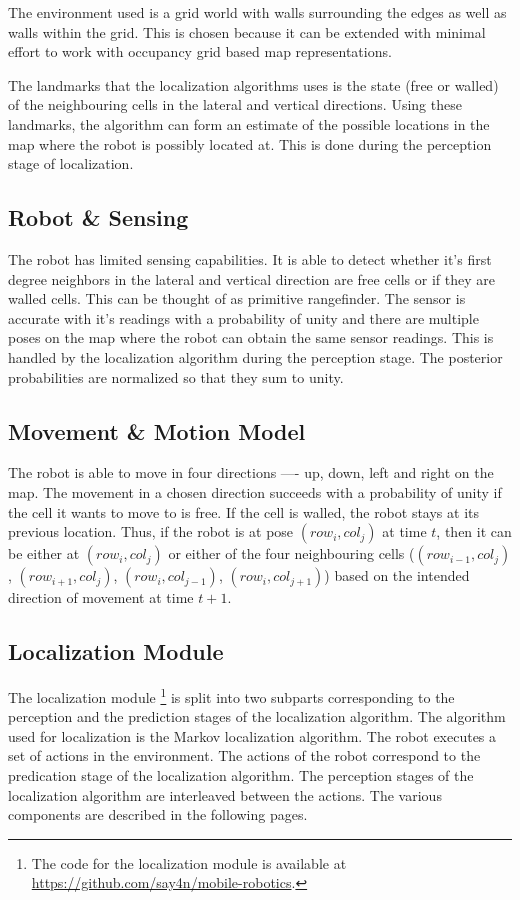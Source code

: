 \documentclass[a4paper,10pt]{article} %
\begin{document}
The environment used is a grid world with walls surrounding the edges as well as walls within the grid.
This is chosen because it can be extended with minimal effort to work with occupancy grid based map representations.

The landmarks that the localization algorithms uses is the state (free or walled) of the neighbouring cells in the lateral and vertical directions.
Using these landmarks, the algorithm can form an estimate of the possible locations in the map where the robot is possibly located at.
This is done during the perception stage of localization.

\subsection{Robot \& Sensing}

The robot has limited sensing capabilities.
It is able to detect whether it's first degree neighbors in the lateral and vertical direction are free cells or if they are walled cells.
This can be thought of as primitive rangefinder.
The sensor is accurate with it's readings with a probability of unity and there are multiple poses on the map where the robot can obtain the same sensor readings.
This is handled by the localization algorithm during the perception stage.
The posterior probabilities are normalized so that they sum to unity.

\subsection{Movement \& Motion Model}

The robot is able to move in four directions —- up, down, left and right on the map.
The movement in a chosen direction succeeds with a probability of unity if the cell it wants to move to is free.
If the cell is walled, the robot stays at its previous location.
Thus, if the robot is at pose $(row_i, col_j)$ at time $t$, then it can be either at $(row_i, col_j)$ or either of the four neighbouring cells ($(row_{i - 1}, col_{j})$, $(row_{i + 1}, col_{j})$, $(row_{i}, col_{j - 1})$, $(row_{i}, col_{j + 1})$) based on the intended direction of movement at time $t + 1$.

\subsection{Localization Module}

The localization module \footnote{The code for the localization module is available at \href{https://github.com/say4n/mobile-robotics}{https://github.com/say4n/mobile-robotics}.} is split into two subparts corresponding to the perception and the prediction stages of the localization algorithm.
The algorithm used for localization is the Markov localization algorithm.
The robot executes a set of actions in the environment.
The actions of the robot correspond to the predication stage of the localization algorithm.
The perception stages of the localization algorithm are interleaved between the actions.
The various components are described in the following pages.
\end{document}
